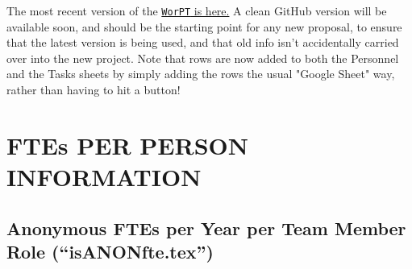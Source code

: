 \documentclass[usenames,dvipsnames,modern]{CLASS_FILES/aastex631}
\begin{document}
The most recent version of the \href{https://docs.google.com/spreadsheets/d/1J9svcoISn2EjHlWNVp2gkKhlgJeGj1BwTQ4coAc9_8E/edit#gid=901021069}{\texttt{WorPT} is here.} A clean GitHub version will be available soon, and should be the starting point for any new proposal, to ensure that the latest version is being used, and that old info isn't accidentally carried over into the new project.  Note that rows are now added to both the Personnel and the Tasks sheets by simply adding the rows the usual "Google Sheet" way, rather than having to hit a button! 

\newpage
\mbox{} \vfill \section{FTEs PER PERSON INFORMATION} \vfill \mbox{}

\newpage
\subsection{\textbf{Anonymous} FTEs per Year per Team Member Role (``isANONfte.tex'')}
\end{document}
